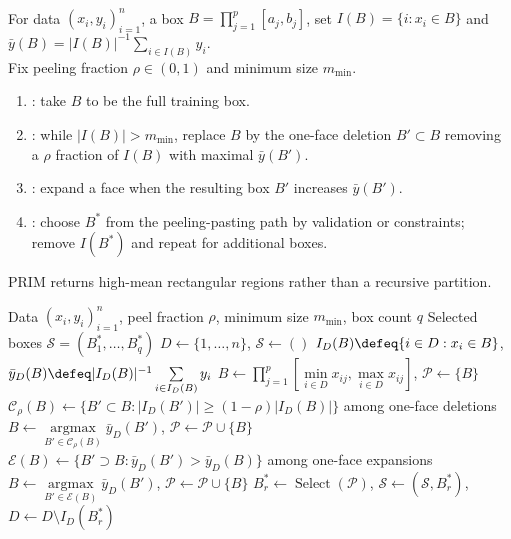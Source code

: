 \begin{method} \label{meplth:sl-prim-box-peeling} \\
For data $(x_i,y_i)_{i=1}^n$, a box $B=\prod_{j=1}^p[a_j,b_j]$, set $I(B)=\{i:x_i\in B\}$ and $\bar y(B)=|I(B)|^{-1}\sum\limits_{i\in I(B)}y_i$.\\
Fix peeling fraction $\rho\in(0,1)$ and minimum size $m_{\min}$.
\begin{enumerate}[label=(\roman*)]
\setlength{\itemsep}{0pt}
\item {}: take $B$ to be the full training box.
\item {}: while $|I(B)|>m_{\min}$, replace $B$ by the one-face deletion $B'\subset B$ removing a $\rho$ fraction of $I(B)$ with maximal $\bar y(B')$.
\item {}: expand a face when the resulting box $B'$ increases $\bar y(B')$.
\item {}: choose $B^*$ from the peeling-pasting path by validation or constraints; remove $I(B^*)$ and repeat for additional boxes.
\end{enumerate}
PRIM returns high-mean rectangular regions rather than a recursive partition.
\end{method}

\begin{breakablealgorithm}
\caption{Patient Rule Induction Method}
\label{alg:sl-prim-box-peeling}
\begin{algorithmic}
\Require Data $(x_i,y_i)_{i=1}^n$, peel fraction $\rho$, minimum size $m_{\min}$, box count $q$
\Ensure Selected boxes $\mathcal S=(B_1^*,\ldots,B_q^*)$
\State $D\gets\{1,\ldots,n\}$, $\mathcal S\gets()$
\State $I_D(B)\defeq\{i\in D:x_i\in B\}$, $\bar y_D(B)\defeq |I_D(B)|^{-1}\sum\limits_{i\in I_D(B)}y_i$
\State $B\gets\prod\limits_{j=1}^p[\min\limits_{i\in D}x_{ij},\max\limits_{i\in D}x_{ij}]$, $\mathcal P\gets\{B\}$
\Repeat
\State $\mathcal C_\rho(B)\gets\{B'\subset B: |I_D(B')|\ge(1-\rho)|I_D(B)|\}$ among one-face deletions
\State $B\gets\operatorname*{argmax}\limits_{B'\in\mathcal C_\rho(B)}\bar y_D(B')$, $\mathcal P\gets\mathcal P\cup\{B\}$
\State $\mathcal E(B)\gets\{B'\supset B: \bar y_D(B')>\bar y_D(B)\}$ among one-face expansions
\State $B\gets\operatorname*{argmax}\limits_{B'\in\mathcal E(B)}\bar y_D(B')$, $\mathcal P\gets\mathcal P\cup\{B\}$
\EndIf
\State $B_r^*\gets\operatorname{Select}(\mathcal P)$, $\mathcal S\gets(\mathcal S,B_r^*)$, $D\gets D\setminus I_D(B_r^*)$
\EndFor
\end{algorithmic}
\end{breakablealgorithm}

